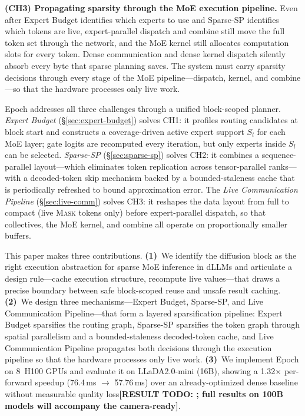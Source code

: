 \documentclass[sigconf,review,anonymous, 10pt]{acmart}
\newcommand{\resulttodo}[1]{\textcolor{todored}{\textbf{[RESULT TODO: #1]}}}
\newcommand{\sys}{Epoch}
\newcommand{\mask}{\textsc{Mask}}
\begin{document}
\textbf{(CH3) Propagating sparsity through the MoE execution pipeline.}
Even after Expert Budget identifies which experts to use and Sparse-SP identifies which tokens are live, expert-parallel dispatch and combine still move the full token set through the network, and the MoE kernel still allocates computation slots for every token.
Dense communication and dense kernel dispatch silently absorb every byte that sparse planning saves.
The system must carry sparsity decisions through every stage of the MoE pipeline---dispatch, kernel, and combine---so that the hardware processes only live work.

\sys{} addresses all three challenges through a unified block-scoped planner.
\emph{Expert Budget} (\S\ref{sec:expert-budget}) solves CH1: it profiles routing candidates at block start and constructs a coverage-driven active expert support $S_l$ for each MoE layer; gate logits are recomputed every iteration, but only experts inside $S_l$ can be selected.
\emph{Sparse-SP} (\S\ref{sec:sparse-sp}) solves CH2: it combines a sequence-parallel layout---which eliminates token replication across tensor-parallel ranks---with a decoded-token skip mechanism backed by a bounded-staleness cache that is periodically refreshed to bound approximation error.
The \emph{Live Communication Pipeline} (\S\ref{sec:live-comm}) solves CH3: it reshapes the data layout from full to compact (live \mask{} tokens only) before expert-parallel dispatch, so that collectives, the MoE kernel, and combine all operate on proportionally smaller buffers.

This paper makes three contributions.
\textbf{(1)}~We identify the diffusion block as the right execution abstraction for sparse MoE inference in dLLMs and articulate a design rule---cache execution structure, recompute live values---that draws a precise boundary between safe block-scoped reuse and unsafe result caching.
\textbf{(2)}~We design three mechanisms---Expert Budget, Sparse-SP, and Live Communication Pipeline---that form a layered sparsification pipeline: Expert Budget sparsifies the routing graph, Sparse-SP sparsifies the token graph through spatial parallelism and a bounded-staleness decoded-token cache, and Live Communication Pipeline propagates both decisions through the execution pipeline so that the hardware processes only live work.
\textbf{(3)}~We implement \sys{} on 8~H100 GPUs and evaluate it on LLaDA2.0-mini (16B), showing a 1.32$\times$ per-forward speedup (76.4\,ms $\to$ 57.76\,ms) over an already-optimized dense baseline without measurable quality loss\resulttodo{; full results on 100B models will accompany the camera-ready}.
\end{document}
